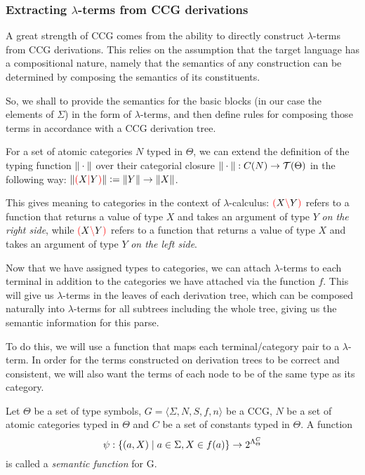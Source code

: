 \documentclass[main.tex]{subfiles}
\begin{document}
\subsubsection{Extracting $\lambda$-terms from CCG derivations}

A great strength of CCG comes from the ability to directly construct $\lambda$-terms
from CCG derivations. This relies on the assumption that the target
language has a compositional nature, namely that the semantics of any construction
can be determined by composing the semantics of its constituents.

So, we shall to provide the semantics for the basic blocks (in our case
the elements of $\Sigma$) in the form of $\lambda$-terms, and then define rules
for composing those terms in accordance with a CCG derivation tree.

\begin{defn}
    For a set of atomic categories $N$ typed in $\Theta$, we can extend the
    definition of the typing function $\|\cdot\|$ over their categorial closure
    $\|\cdot\| : C(N) \rightarrow \mathcal{T}( \Theta )$ in the following way:
    $\|\textcolor{red}{(} X \textcolor{red}{|} Y \textcolor{red}{)}\| \vcentcolon=  \|Y\| \rightarrow \|X\|$.

    This gives meaning to categories in the context of $\lambda$-calculus:
    $\textcolor{red}{(} X \textcolor{red}{\backslash} Y \textcolor{red}{)}$ refers to a function that returns a value of type
    $X$ and takes an argument of type $Y$ \emph{on the right side}, while
    $\textcolor{red}{(} X \textcolor{red}{\backslash} Y \textcolor{red}{)}$ refers to a function that returns a value of type
    $X$ and takes an argument of type $Y$ \emph{on the left side}.
\end{defn}

Now that we have assigned types to categories, we can attach $\lambda$-terms
to each terminal in addition to the categories we have attached via the function
$f$. This will give us $\lambda$-terms in the leaves of each derivation tree,
which can be composed naturally into $\lambda$-terms for all subtrees including
the whole tree, giving us the semantic information for this parse.

To do this, we will use a function that maps each terminal/category pair
to a $\lambda$-term. In order for the terms constructed on derivation trees
to be correct and consistent, we will also want the terms of each node to be
of the same type as its category.

\begin{defn}
    Let $\Theta$ be a set of type symbols,
    $ G = \langle \Sigma, N, S, f, n \rangle $ be a CCG, $N$ be
    a set of atomic categories typed in $\Theta$ and $C$ be a set
    of constants typed in $\Theta$.
    A function
    \[ \psi : \{ (a, X) \mid a \in \Sigma, X \in f(a) \} \rightarrow 2^{\Lambda^{C}_{\Theta}} \] is called a
    \emph{semantic function} for G.
\end{defn}
\end{document}
